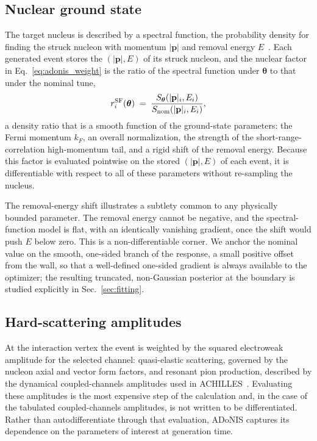 \documentclass[aps,prd,reprint,superscriptaddress,nofootinbib,amsmath,amssymb,floatfix]{revtex4-1}
\newcommand{\adonis}{{ADoNIS}\xspace}
\begin{document}
\subsection{Nuclear ground state}
\label{sec:adonis_nucleus}

The target nucleus is described by a spectral function, the probability density
for finding the struck nucleon with momentum $|\mathbf{p}|$ and removal energy
$E$~\cite{Isaacson:2020wlx}. Each generated event stores the $(|\mathbf{p}|, E)$
of its struck nucleon, and the nuclear factor in Eq.~\ref{eq:adonis_weight} is
the ratio of the spectral function under $\bm\theta$ to that under the nominal
tune,
\begin{equation}
r^{\rm SF}_i(\bm\theta) \;=\;
\frac{S_{\bm\theta}\!\left(|\mathbf{p}|_i, E_i\right)}
     {S_{\rm nom}\!\left(|\mathbf{p}|_i, E_i\right)},
\end{equation}
a density ratio that is a smooth function of the ground-state parameters: the
Fermi momentum $k_F$, an overall normalization, the strength of the
short-range-correlation high-momentum tail, and a rigid shift of the removal
energy. Because this factor is evaluated pointwise on the stored $(|\mathbf{p}|,E)$
of each event, it is differentiable with respect to all of these parameters
without re-sampling the nucleus.

The removal-energy shift illustrates a subtlety common to any physically bounded
parameter. The removal energy cannot be negative, and the spectral-function
model is flat, with an identically vanishing gradient, once the shift would push
$E$ below zero. This is a non-differentiable corner. We anchor the nominal value
on the smooth, one-sided branch of the response, a small positive offset from the
wall, so that a well-defined one-sided gradient is always available to the
optimizer; the resulting truncated, non-Gaussian posterior at the boundary is
studied explicitly in Sec.~\ref{sec:fitting}.

\subsection{Hard-scattering amplitudes}
\label{sec:adonis_amplitudes}

At the interaction vertex the event is weighted by the squared electroweak
amplitude for the selected channel: quasi-elastic scattering, governed by the
nucleon axial and vector form factors, and resonant pion production, described by
the dynamical coupled-channels amplitudes used in
ACHILLES~\cite{Isaacson:2022cwh, Nakamura:2015rta}. Evaluating these amplitudes
is the most expensive step of the calculation and, in the case of the tabulated
coupled-channels amplitudes, is not written to be differentiated. Rather than
autodifferentiate through that evaluation, \adonis captures its dependence on the
parameters of interest at generation time.
\end{document}
